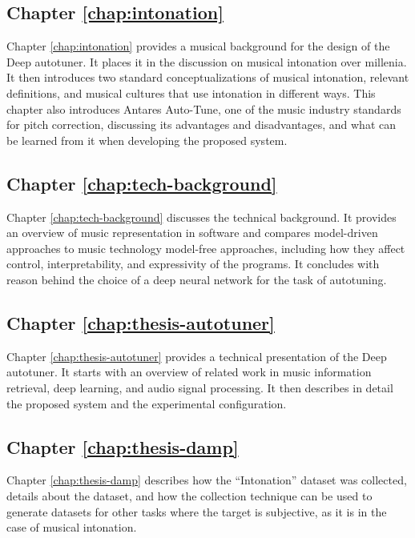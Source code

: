 \subsection{Chapter \ref{chap:intonation}}
Chapter \ref{chap:intonation} provides a musical background for the design of the Deep autotuner. It places it in the discussion on musical intonation over millenia. It then introduces two standard conceptualizations of musical intonation, relevant definitions, and musical cultures that use intonation in different ways. This chapter also introduces Antares Auto-Tune, one of the music industry standards for pitch correction, discussing its advantages and disadvantages, and what can be learned from it when developing the proposed system.

\subsection{Chapter \ref{chap:tech-background}}
Chapter \ref{chap:tech-background} discusses the technical background. It provides an overview of music representation in software and compares model-driven approaches to music technology model-free approaches,  including how they affect control, interpretability, and expressivity of the programs. It concludes with reason behind the choice of a deep neural network for the task of autotuning.

\subsection{Chapter \ref{chap:thesis-autotuner}}
Chapter \ref{chap:thesis-autotuner} provides a technical presentation of the Deep autotuner. It starts with an overview of related work in music information retrieval, deep learning, and audio signal processing. It then describes in detail the proposed system and the experimental configuration.

\subsection{Chapter \ref{chap:thesis-damp}}
Chapter \ref{chap:thesis-damp} describes how the ``Intonation'' dataset was collected, details about the dataset, and how the collection technique can be used to generate datasets for other tasks where the target is subjective, as it is in the case of musical intonation. 

